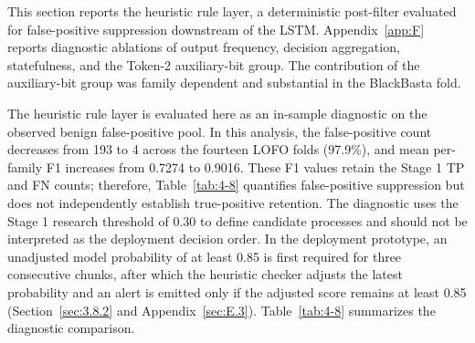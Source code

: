 This section reports the heuristic rule layer, a deterministic post-filter evaluated for false-positive suppression downstream of the \textmu{}LSTM. Appendix~\ref{app:F} reports diagnostic ablations of output frequency, decision aggregation, statefulness, and the Token-2 auxiliary-bit group. The contribution of the auxiliary-bit group was family dependent and substantial in the BlackBasta fold.

The heuristic rule layer is evaluated here as an in-sample diagnostic on the observed benign false-positive pool. In this analysis, the false-positive count decreases from 193 to 4 across the fourteen LOFO folds (97.9\%), and mean per-family F1 increases from 0.7274 to 0.9016. These F1 values retain the Stage 1 TP and FN counts; therefore, Table~\ref{tab:4-8} quantifies false-positive suppression but does not independently establish true-positive retention. The diagnostic uses the Stage 1 research threshold of 0.30 to define candidate processes and should not be interpreted as the deployment decision order. In the deployment prototype, an unadjusted model probability of at least 0.85 is first required for three consecutive chunks, after which the heuristic checker adjusts the latest probability and an alert is emitted only if the adjusted score remains at least 0.85 (Section~\ref{sec:3.8.2} and Appendix~\ref{sec:E.3}). Table~\ref{tab:4-8} summarizes the diagnostic comparison.


